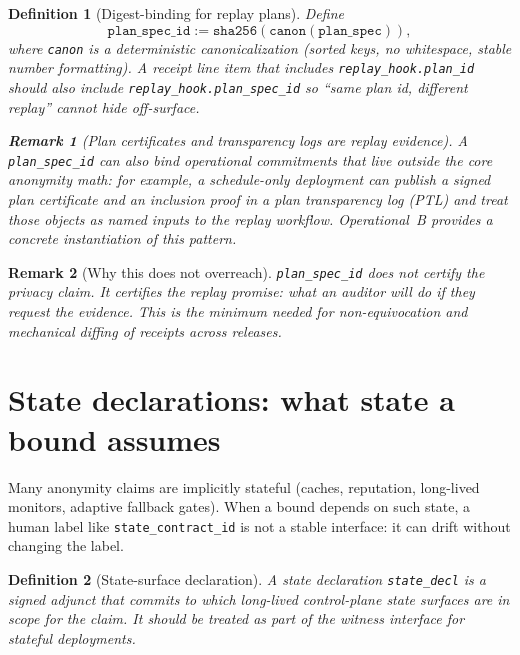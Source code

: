 \documentclass[11pt]{article}
\newtheorem{definition}{Definition}
\newtheorem{remark}{Remark}
\begin{document}
\begin{definition}[Digest-binding for replay plans]
Define
\[\texttt{plan\_spec\_id} := \texttt{sha256}(\texttt{canon}(\texttt{plan\_spec})),\]
where \texttt{canon} is a deterministic canonicalization (sorted keys, no whitespace, stable number formatting).
A receipt line item that includes \texttt{replay\_hook.plan\_id} should also include \texttt{replay\_hook.plan\_spec\_id} so ``same plan id, different replay'' cannot hide off-surface.\cite{series:receiptitems,series:workedexample}
\begin{remark}[Plan certificates and transparency logs are replay evidence]
A \texttt{plan\_spec\_id} can also bind operational commitments that live outside the core anonymity math: for example,
a schedule-only deployment can publish a signed plan certificate and an inclusion proof in a plan transparency log (PTL) and treat those objects as named inputs to the replay workflow.
Operational~B provides a concrete instantiation of this pattern.\cite{series:operationalB}
\end{remark}

\end{definition}

\begin{remark}[Why this does not overreach]
\texttt{plan\_spec\_id} does \emph{not} certify the privacy claim.
It certifies the \emph{replay promise}: what an auditor will do if they request the evidence.
This is the minimum needed for non-equivocation and mechanical diffing of receipts across releases.
\end{remark}

\section{State declarations: what state a bound assumes}
Many anonymity claims are implicitly stateful (caches, reputation, long-lived monitors, adaptive fallback gates).
When a bound depends on such state, a human label like \texttt{state\_contract\_id} is not a stable interface:
it can drift without changing the label.

\begin{definition}[State-surface declaration]
A \emph{state declaration} \texttt{state\_decl} is a signed adjunct that commits to which long-lived control-plane state surfaces are in scope for the claim.
It should be treated as part of the witness interface for stateful deployments.\cite{series:state1,series:workedexample}
\end{definition}
\end{document}
